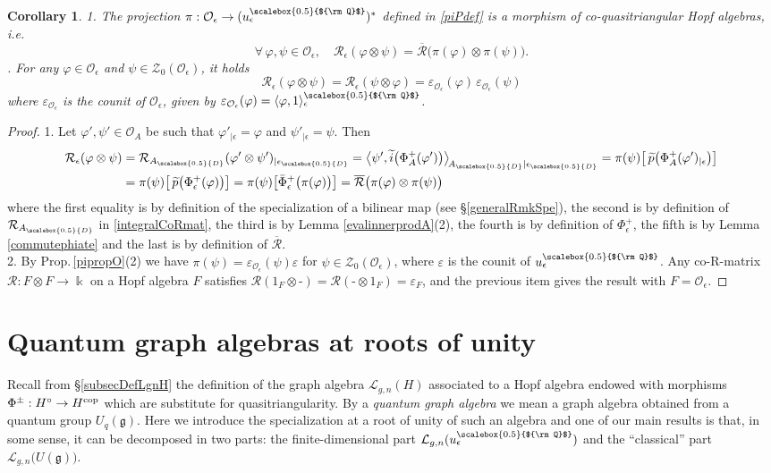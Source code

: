 \documentclass[11pt]{amsart}
\newtheorem{cor}[teo]{Corollary}
\newcommand{\e}{\epsilon}
\newcommand{\Oo}{\mathcal{O}}
\newcommand{\eD}{\epsilon_{\scalebox{0.5}{D}}}
\newcommand{\AD}{A_{\scalebox{0.5}{D}}}
\newcommand{\Q}{{\scalebox{0.5}{${\rm Q}$}}}
\begin{document}
\begin{cor}\label{relationsCoRMatAtEps}
1. The projection $\pi : \Oo_\e \to (u_\e^\Q)^*$ defined in \eqref{piPdef} is a morphism of co-quasitriangular Hopf algebras, i.e.
\[ \forall \, \varphi, \psi \in \Oo_\e, \quad \mathcal{R}_{\e}(\varphi \otimes \psi) = \overline{\mathcal{R}}\bigl( \pi(\varphi) \otimes \pi(\psi) \bigr). \]
. For any $\varphi \in \Oo_\e$ and $\psi \in \mathcal{Z}_0(\Oo_\e)$, it holds
\[ \mathcal{R}_{\e}(\varphi \otimes \psi) = \mathcal{R}_{\e}(\psi \otimes \varphi) = \varepsilon_{\Oo_\e}(\varphi)\,\varepsilon_{\Oo_\e}(\psi) \]
where $\varepsilon_{\Oo_\e}$ is the counit of $\Oo_\e$, given by $\varepsilon_{\Oo_\e}(\varphi) = \langle \varphi, 1 \rangle_\e^\Q$.
\end{cor}
\begin{proof}
1. Let $\varphi', \psi' \in \Oo_A$ be such that $\varphi'_{|\e} = \varphi$ and $\psi'_{|\e} = \psi$. Then
\begin{align*}
\mathcal{R}_{\e}(\varphi \otimes \psi) &= \mathcal{R}_{\AD}(\varphi' \otimes \psi')_{|\eD} = \bigl\langle  \psi', \widetilde{i}\bigl(\Phi^+_A(\varphi') \bigr) \bigr\rangle_{\!\AD|\eD} = \pi(\psi)\bigl[ \, \widetilde{p}\bigl(\Phi^+_A(\varphi')_{|\e} \bigr) \bigr]\\
&= \pi(\psi)\bigl[ \, \widetilde{p}\bigl(\Phi^+_\e(\varphi) \bigr) \bigr] = \pi(\psi)\bigl[ \bar{\Phi}^+_\e\bigl(\pi(\varphi) \bigr) \bigr] = \overline{\mathcal{R}}\bigl( \pi(\varphi) \otimes \pi(\psi) \bigr)
\end{align*}
where the first equality is by definition of the specialization of a bilinear map (see \S\ref{generalRmkSpe}), the second is by definition of $\mathcal{R}_{\AD}$ in \eqref{integralCoRmat}, the third is by Lemma \ref{evalinnerprodA}(2), the fourth is by definition of $\Phi^+_\e$, the fifth is by Lemma \ref{commutephiate} and the last is by definition of $\overline{\mathcal{R}}$.
\\2. By Prop.\,\ref{pipropO}(2) we have $\pi(\psi) = \varepsilon_{\Oo_\e}(\psi)\varepsilon$ for $\psi \in \mathcal{Z}_0(\Oo_\e)$, where $\varepsilon$ is the counit of $u_\e^\Q$. Any co-R-matrix $\mathcal{R} : F \otimes F \to \Bbbk$ on a Hopf algebra $F$ satisfies $\mathcal{R}(1_F \otimes \text{-}) = \mathcal{R}(\text{-} \otimes 1_F) = \varepsilon_F$, and the previous item gives the result with $F=\Oo_\e$.
\end{proof}

\section{Quantum graph algebras at roots of unity}\label{secdefLgn}
Recall from \S\ref{subsecDefLgnH} the definition of the graph algebra $\mathcal{L}_{g,n}(H)$ associated to a Hopf algebra endowed with morphisms $\Phi^\pm : H^\circ \to H^{\rm cop}$ which are substitute for quasitriangularity. By a {\em quantum graph algebra} we mean a graph algebra obtained from a quantum group $U_q(\mathfrak{g})$. Here we introduce the specialization at a root of unity of such an algebra and one of our main results is that, in some sense, it can be decomposed in two parts: the finite-dimensional part $\mathcal{L}_{g,n}(u_\e^\Q)$ and the ``classical'' part $\mathcal{L}_{g,n}\bigl( U(\mathfrak{g}) \bigr)$.
\end{document}
